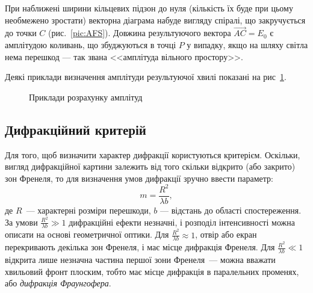 При наближені ширини кільцевих підзон до нуля (кількість їх буде при цьому необмежено зростати) векторна діаграма набуде вигляду спіралі, що закручується до точки $ C $ (рис.~\ref{pic:AFS}). Довжина результуючого вектора $ \vec{AC} = E_0 $ є амплітудою коливань, що збуджуються в точці $ P $ у випадку, якщо на шляху світла нема перешкод --- так звана <<амплітуда вільного простору>>.


Деякі приклади визначення амплітуди результуючої хвилі показані на рис~\ref{pic:vect_diagrams}.
\begin{figure}[h!]\centering
    
\caption{Приклади розрахунку амплітуд}
\label{pic:vect_diagrams}
\end{figure}





\subsection*{Дифракційний критерій}


Для того, щоб визначити характер дифракції користуються критерієм. Оскільки, вигляд дифракційної  картини залежить від того скільки відкрито (або закрито) зон Френеля, то для визначення умов дифракції зручно ввести параметр:
\begin{equation}\label{eq:m_number_of_zones}
   m = \frac{R^2}{\lambda b},
\end{equation}
де $R$~--- характерні розміри перешкоди, $ b $ --- відстань до області спостереження.  За умови $\frac{R^2}{\lambda b} \gg1$ дифракційні ефекти незначні, і розподіл інтенсивності можна описати на основі  геометричної оптики. Для $\frac{R^2}{\lambda b}\approx1$, отвір або екран перекривають декілька зон Френеля, і має місце дифракція Френеля. Для $\frac{R^2}{\lambda b}\ll1$ відкрита лише незначна частина першої зони Френеля~--- можна вважати хвильовий фронт плоским, тобто має місце дифракція в  паралельних променях, або \emph{дифракція Фраунгофера}.






